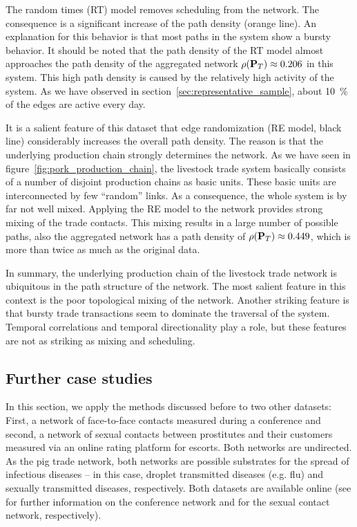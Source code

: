 The random times (RT) model removes scheduling from the network.
The consequence is a significant increase of the path density (orange line).
An explanation for this behavior is that most paths in the system show a bursty behavior.
It should be noted that the path density of the RT model almost approaches the path density of the aggregated network $\rho (\mathbf{P}_T)\approx 0.206$ in this system.
This high path density is caused by the relatively high activity of the system.
As we have observed in section~\ref{sec:representative_sample}, about 10~\% of the edges are active every day.

It is a salient feature of this dataset that edge randomization (RE model, black line) considerably increases the overall path density.
The reason is that the underlying production chain strongly determines the network.
As we have seen in figure~\ref{fig:pork_production_chain}, the livestock trade system basically consists of a number of disjoint production chains as basic units.
These basic units are interconnected by few ``random'' links.
As a consequence, the whole system is by far not well mixed.
Applying the RE model to the network provides strong mixing of the trade contacts.
This mixing results in a large number of possible paths, also the aggregated network has a path density of $\rho (\mathbf{P}_T)\approx 0.449$, which is more than twice as much as the original data.

In summary, the underlying production chain of the livestock trade network is ubiquitous in the path structure of the network.
The most salient feature in this context is the poor topological mixing of the network.
Another striking feature is that bursty trade transactions seem to dominate the traversal of the system.
Temporal correlations and temporal directionality play a role, but these features are not as striking as mixing and scheduling.

\subsection{Further case studies}
In this section, we apply the methods discussed before to two other datasets:
First, a network of face-to-face contacts measured during a conference and second, a network of sexual contacts between prostitutes and their customers measured via an online rating platform for escorts.
Both networks are undirected.
As the pig trade network, both networks are possible substrates for the spread of infectious diseases -- in this case, droplet transmitted diseases (e.g. flu) and sexually transmitted diseases, respectively.
Both datasets are available online (see \citep{isella2011,sociopatterns.org} for further information on the conference network and \citep{Rocha_pnas} for the sexual contact network, respectively).

